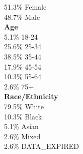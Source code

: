51.3\% Female \\
48.7\% Male \\

\textbf{Age} \\
5.1\% 18-24 \\
25.6\% 25-34 \\
38.5\% 35-44 \\
17.9\% 45-54 \\
10.3\% 55-64 \\
2.6\% 75+ \\

\textbf{Race/Ethnicity} \\
79.5\% White \\
10.3\% Black \\
5.1\% Asian \\
2.6\% Mixed \\
2.6\% DATA_EXPIRED \\

